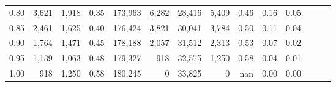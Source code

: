 \begin{tabular}{rrrrrrrrrrrrrr}
0.80 &   3,621 &  1,918 &  0.35 &  173,963 &    6,282 &  28,416 &   5,409 &  0.46 &  0.16 &      0.05 \\
0.85 &   2,461 &  1,625 &  0.40 &  176,424 &    3,821 &  30,041 &   3,784 &  0.50 &  0.11 &      0.04 \\
0.90 &   1,764 &  1,471 &  0.45 &  178,188 &    2,057 &  31,512 &   2,313 &  0.53 &  0.07 &      0.02 \\
0.95 &   1,139 &  1,063 &  0.48 &  179,327 &      918 &  32,575 &   1,250 &  0.58 &  0.04 &      0.01 \\
1.00 &     918 &  1,250 &  0.58 &  180,245 &        0 &  33,825 &       0 &   nan &  0.00 &      0.00 \\
\bottomrule
\end{tabular}
